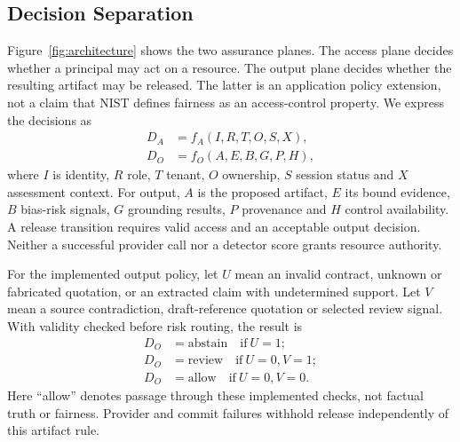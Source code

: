\documentclass[conference]{IEEEtran}
\begin{document}
\subsection{Decision Separation}
Figure~\ref{fig:architecture} shows the two assurance planes. The access plane decides whether a principal may act on a resource. The output plane decides whether the resulting artifact may be released. The latter is an application policy extension, not a claim that NIST defines fairness as an access-control property. We express the decisions as
\begin{align}
D_A &= f_A(I,R,T,O,S,X), \\
D_O &= f_O(A,E,B,G,P,H),
\end{align}
where $I$ is identity, $R$ role, $T$ tenant, $O$ ownership, $S$ session status and $X$ assessment context. For output, $A$ is the proposed artifact, $E$ its bound evidence, $B$ bias-risk signals, $G$ grounding results, $P$ provenance and $H$ control availability. A release transition requires valid access and an acceptable output decision. Neither a successful provider call nor a detector score grants resource authority.

For the implemented output policy, let $U$ mean an invalid contract, unknown or fabricated quotation, or an extracted claim with undetermined support. Let $V$ mean a source contradiction, draft-reference quotation or selected review signal. With validity checked before risk routing, the result is
\begin{equation}
\begin{aligned}
D_O&=\mathrm{abstain}\quad\mathrm{if}\ U=1;\\
D_O&=\mathrm{review}\quad\mathrm{if}\ U=0,V=1;\\
D_O&=\mathrm{allow}\quad\mathrm{if}\ U=0,V=0.
\end{aligned}
\label{eq:output-rule}
\end{equation}
Here ``allow'' denotes passage through these implemented checks, not factual truth or fairness. Provider and commit failures withhold release independently of this artifact rule.
\end{document}
